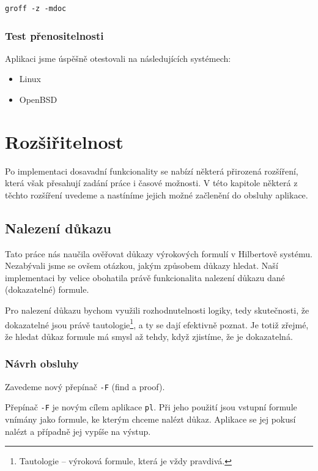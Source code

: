 \documentclass[thesis=B,czech,hidelinks]{thesis}[2012/06/26]
\begin{document}
\begin{lstlisting}
groff -z -mdoc
\end{lstlisting}

\subsection{Test přenositelnosti}

Aplikaci jsme úspěšně otestovali na následujících systémech:

\begin{itemize}
	\item Linux
	\item OpenBSD
\end{itemize}

%
%
%

\chapter{Rozšiřitelnost}

Po implementaci dosavadní funkcionality se nabízí některá přirozená rozšíření, která však přesahují zadání práce i časové možnosti. V této kapitole některá z těchto rozšíření uvedeme a nastíníme jejich možné začlenění do obsluhy aplikace.

\section{Nalezení důkazu}

Tato práce nás naučila ověřovat důkazy výrokových formulí v Hilbertově systému. Nezabývali jsme se ovšem otázkou, jakým způsobem důkazy hledat. Naší implementaci by velice obohatila právě funkcionalita nalezení důkazu dané (dokazatelné) formule.

Pro nalezení důkazu bychom využili rozhodnutelnosti logiky, tedy skutečnosti, že dokazatelné jsou právě tautologie\footnote{Tautologie -- výroková formule, která je vždy pravdivá.}, a ty se dají efektivně poznat. Je totiž zřejmé, že hledat důkaz formule má smysl až tehdy, když zjistíme, že je dokazatelná.

\subsection{Návrh obsluhy}

Zavedeme nový přepínač \texttt{-F} (find a proof).

Přepínač \texttt{-F} je novým cílem aplikace \texttt{pl}. Při jeho použití jsou vstupní formule vnímány jako formule, ke kterým chceme nalézt důkaz. Aplikace se jej pokusí nalézt a případně jej vypíše na výstup.
\end{document}
